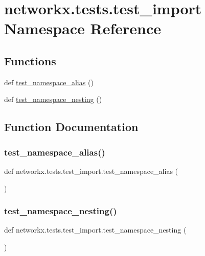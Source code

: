 \hypertarget{namespacenetworkx_1_1tests_1_1test__import}{}\section{networkx.\+tests.\+test\+\_\+import Namespace Reference}
\label{namespacenetworkx_1_1tests_1_1test__import}
\subsection*{Functions}
\begin{DoxyCompactItemize}
\item 
def \hyperlink{namespacenetworkx_1_1tests_1_1test__import_ac07914143a89323a2f399aebb9a0b663}{test\+\_\+namespace\+\_\+alias} ()
\item 
def \hyperlink{namespacenetworkx_1_1tests_1_1test__import_acc907e40cd2be57ac1e446541ca15bf4}{test\+\_\+namespace\+\_\+nesting} ()
\end{DoxyCompactItemize}


\subsection{Function Documentation}
\mbox{\label{namespacenetworkx_1_1tests_1_1test__import_ac07914143a89323a2f399aebb9a0b663}} 
\subsubsection{\texorpdfstring{test\+\_\+namespace\+\_\+alias()}{test\_namespace\_alias()}}
{\footnotesize\ttfamily def networkx.\+tests.\+test\+\_\+import.\+test\+\_\+namespace\+\_\+alias (\begin{DoxyParamCaption}{ }\end{DoxyParamCaption})}

\mbox{\label{namespacenetworkx_1_1tests_1_1test__import_acc907e40cd2be57ac1e446541ca15bf4}} 
\subsubsection{\texorpdfstring{test\+\_\+namespace\+\_\+nesting()}{test\_namespace\_nesting()}}
{\footnotesize\ttfamily def networkx.\+tests.\+test\+\_\+import.\+test\+\_\+namespace\+\_\+nesting (\begin{DoxyParamCaption}{ }\end{DoxyParamCaption})}

